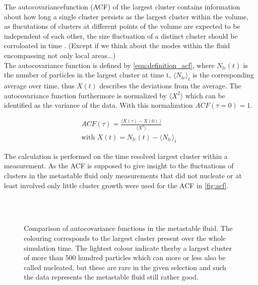 The autocovariancefunction (ACF) of the largest cluster contains information about how long a single cluster persists as the largest cluster within the volume, as flucutations of clusters at different points of the volume are expected to be independent of each other, the size fluctuation of a distinct cluster should be corroloated in time . (Except if we think about the modes within the fluid encompassing not only local areas...)\\

The autocovariance function is defined by \autoref{eqn:definition_acf}, where $N_{lc}(t)$ is the number of particles in the largest cluster at time t, $\langle N_{lc} \rangle_t$ is the corresponding average over time, thus $X(t)$ describes the deviations from the average. The autocovariance function furthermore is normalized by ${ \langle X^2  \rangle }$ which can be identified as the variance of the data. With this normalization $ACF(\tau=0) = 1 $.

\begin{align}
\label{eqn:definition_acf} 
ACF(\tau)=\frac{ \langle  X(\tau)-X(0) \! \: \rangle } { \langle X^2  \rangle }\\  
\text{with } X(t)=N_{lc}(t)- \langle N_{lc} \rangle_t 
\end{align}

The calculation is performed on the time resolved largest cluster within a measurement. As the ACF is supposed to give insight to the fluctuations of clusters in the metastable fluid only measurements that did not nucleate or at least involved only little cluster growth were used for the ACF in \autoref{fig:acf}.  



\begin{figure}[h]
\begin{center}
 \hspace{0.5cm}
 \\
 \hspace{0.5cm}
 \\
\caption{Comparison of autocovariance functions in the metastable fluid. The colouring corresponds to the largest cluster present over the whole simulation time. The lightest colour indicate therby a largest cluster of more than 500 hundred particles which can more or less also be called nucleated, but these are rare in the given selection and such the data represents the metastable fluid still rather good.}
\label{fig:acf}
\end{center}
\end{figure}

